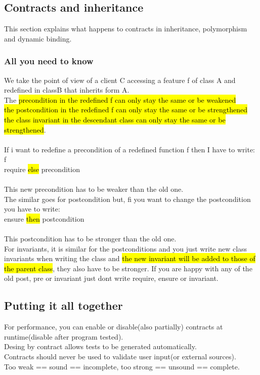 \documentclass[11pt]{article}
\newcommand\tab[1][1cm]{\hspace*{#1}}
\begin{document}
\subsection{Contracts and inheritance}
This section explains what happens to contracts in inheritance, polymorphism and dynamic binding.
\subsubsection{All you need to know}
We take the point of view of a client C accessing a feature f of class A and redefined in classB that inherits form A.\\The \hl{precondition in the redefined f can only stay the same or be weakened}\\\hl{the postcondition in the redefined f can only stay the same or be strengthened}\\\hl{the class invariant in the descendant class can only stay the same or be strengthened}.\\\\If i want to redefine a precondition of a redefined function f then I have to write:\\f\\\tab require \hl{else} precondition\\\\This new precondition has to be weaker than the old one.\\The similar goes for postcondition but, fi you want to change the postcondition you have to write:\\ ensure \hl{then} postcondition\\\\This postcondition has to be stronger than the old one.\\For invariants, it is similar for the postconditions and you just write new class invariants when writing the class and \hl{the new invariant will be added to those of the parent class}, they also have to be stronger. If you are happy with any of the old post, pre or invariant just dont write require, ensure or invariant.
\subsection{Putting it all together}
For performance, you can enable or disable(also partially) contracts at runtime(disable after program tested).\\Desing by contract allows tests to be generated automatically.\\Contracts should never be used to validate user input(or external sources).\\ Too weak == sound == incomplete, too strong == unsound == complete.
\end{document}
